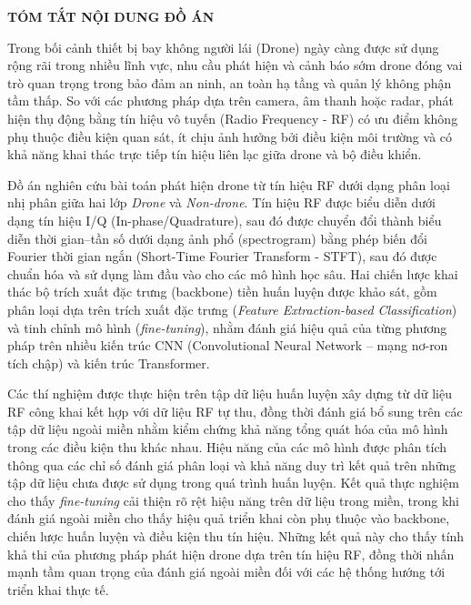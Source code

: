 \documentclass[../DoAn.tex]{subfiles}
\begin{document}
\begin{center}
    \Large{\textbf{TÓM TẮT NỘI DUNG ĐỒ ÁN}}\\
\end{center}
\vspace{1cm}

Trong bối cảnh thiết bị bay không người lái (Drone) ngày càng được sử dụng rộng rãi trong nhiều lĩnh vực, nhu cầu phát hiện và cảnh báo sớm drone đóng vai trò quan trọng trong bảo đảm an ninh, an toàn hạ tầng và quản lý không phận tầm thấp. So với các phương pháp dựa trên camera, âm thanh hoặc radar, phát hiện thụ động bằng tín hiệu vô tuyến (Radio Frequency - RF) có ưu điểm không phụ thuộc điều kiện quan sát, ít chịu ảnh hưởng bởi điều kiện môi trường và có khả năng khai thác trực tiếp tín hiệu liên lạc giữa drone và bộ điều khiển.

Đồ án nghiên cứu bài toán phát hiện drone từ tín hiệu RF dưới dạng phân loại nhị phân giữa hai lớp \textit{Drone} và \textit{Non-drone}. Tín hiệu RF được biểu diễn dưới dạng tín hiệu I/Q (In-phase/Quadrature), sau đó được chuyển đổi thành biểu diễn thời gian–tần số dưới dạng ảnh phổ (spectrogram) bằng phép biến đổi Fourier thời gian ngắn (Short-Time Fourier Transform - STFT), sau đó được chuẩn hóa và sử dụng làm đầu vào cho các mô hình học sâu. Hai chiến lược khai thác bộ trích xuất đặc trưng (backbone) tiền huấn luyện được khảo sát, gồm phân loại dựa trên trích xuất đặc trưng (\textit{Feature Extraction-based Classification}) và tinh chỉnh mô hình (\textit{fine-tuning}), nhằm đánh giá hiệu quả của từng phương pháp trên nhiều kiến trúc CNN (Convolutional Neural Network – mạng nơ-ron tích chập) và kiến trúc Transformer.

Các thí nghiệm được thực hiện trên tập dữ liệu huấn luyện xây dựng từ dữ liệu RF công khai kết hợp với dữ liệu RF tự thu, đồng thời đánh giá bổ sung trên các tập dữ liệu ngoài miền nhằm kiểm chứng khả năng tổng quát hóa của mô hình trong các điều kiện thu khác nhau. Hiệu năng của các mô hình được phân tích thông qua các chỉ số đánh giá phân loại và khả năng duy trì kết quả trên những tập dữ liệu chưa được sử dụng trong quá trình huấn luyện. Kết quả thực nghiệm cho thấy \textit{fine-tuning} cải thiện rõ rệt hiệu năng trên dữ liệu trong miền, trong khi đánh giá ngoài miền cho thấy hiệu quả triển khai còn phụ thuộc vào backbone, chiến lược huấn luyện và điều kiện thu tín hiệu. Những kết quả này cho thấy tính khả thi của phương pháp phát hiện drone dựa trên tín hiệu RF, đồng thời nhấn mạnh tầm quan trọng của đánh giá ngoài miền đối với các hệ thống hướng tới triển khai thực tế.
\end{document}
